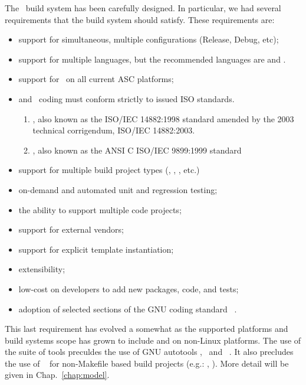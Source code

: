 The \draco\ build system has been carefully designed.  In particular,
we had several requirements that the build system should satisfy.
These requirements are:
\begin{itemize}
  \item support for simultaneous, multiple configurations (Release, Debug, etc);
  \item support for multiple languages, but the recommended languages are  and \cpp.
  \item support for \cpp\ on all current ASC platforms;
  \item {} and \cpp\ coding must conform strictly to issued ISO standards. 
\begin{enumerate}
\item {}, also known as the ISO/IEC 14882:1998 standard amended by the 2003 technical corrigendum, ISO/IEC 14882:2003.  
\item {}, also known as the ANSI C ISO/IEC 9899:1999 standard 
\end{enumerate}
  \item support for multiple build project types (, , , etc.)
\item on-demand and automated unit and regression testing;
\item the ability to support multiple code projects;
\item support for external vendors;
  \item support for explicit template instantiation;
\item extensibility;
\item low-cost on developers to add new packages, code, and tests; 
\item  adoption of selected sections of the GNU coding standard~\cite{gnu} .
\end{itemize}
This last requirement has evolved a somewhat as the supported
platforms and build systems scope has grown to include   and
  on non-Linux platforms.  The use of the \cmake {} suite of tools
preculdes the use of GNU autotools ,
\autoconf\ and \automake~\cite{autoconf}.  
It also precludes the use of \make~\cite{gmake} for non-Makefile based
build projects (e.g.: , ). More detail will be given in
Chap.~\ref{chap:model}. 

